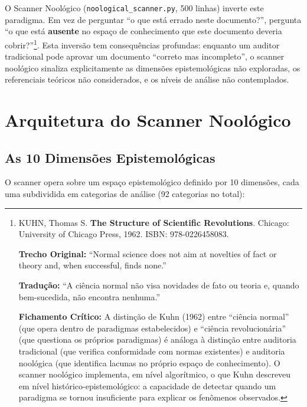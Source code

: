 O Scanner Noológico (\texttt{noological\_scanner.py}, 500 linhas) inverte este paradigma. Em vez de perguntar ``o que está errado neste documento?'', pergunta ``o que está \textbf{ausente} no espaço de conhecimento que este documento deveria cobrir?''\footnote{
  KUHN, Thomas S. \textbf{The Structure of Scientific Revolutions}. Chicago: University of Chicago Press, 1962. ISBN: 978-0226458083.

  \textbf{Trecho Original:} ``Normal science does not aim at novelties of fact or theory and, when successful, finds none.''

  \textbf{Tradução:} ``A ciência normal não visa novidades de fato ou teoria e, quando bem-sucedida, não encontra nenhuma.''

  \textbf{Fichamento Crítico:} A distinção de Kuhn (1962) entre ``ciência normal'' (que opera dentro de paradigmas estabelecidos) e ``ciência revolucionária'' (que questiona os próprios paradigmas) é análoga à distinção entre auditoria tradicional (que verifica conformidade com normas existentes) e auditoria noológica (que identifica lacunas no próprio espaço de conhecimento). O scanner noológico implementa, em nível algorítmico, o que Kuhn descreveu em nível histórico-epistemológico: a capacidade de detectar quando um paradigma se tornou insuficiente para explicar os fenômenos observados.
}. Esta inversão tem consequências profundas: enquanto um auditor tradicional pode aprovar um documento ``correto mas incompleto'', o scanner noológico sinaliza explicitamente as dimensões epistemológicas não exploradas, os referenciais teóricos não considerados, e os níveis de análise não contemplados.

\section{Arquitetura do Scanner Noológico}

\subsection{As 10 Dimensões Epistemológicas}

O scanner opera sobre um espaço epistemológico definido por 10 dimensões, cada uma subdividida em categorias de análise (92 categorias no total):

